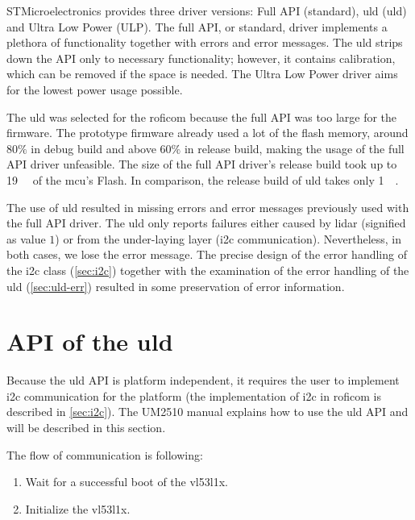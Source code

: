 \documentclass[
  digital,     %
  oneside,     %
  nosansbold,  %
  nocolorbold, %
  nolof,         %
  nolot,         %
]{fithesis4}
\begin{document}
{{{STMicroelectronics provides three driver versions: Full API (standard), \acrlong{uld} (\acrshort{uld}) and Ultra Low Power (ULP). The full API, or standard, driver implements a plethora of functionality together with errors and error messages. The \acrlong{uld} strips down the API only to necessary functionality; however, it contains calibration, which can be removed if the space is needed. The Ultra Low Power driver aims for the lowest power usage possible.

The \acrlong{uld} was selected for the \acrshort{roficom} because the full API was too large for the firmware. The prototype firmware already used a lot of the flash memory, around $80\%$ in debug build and above $60\%$ in release build, making the usage of the full API driver unfeasible. The size of the full API driver's release build took up to \qty{19}{\kilo\byte} of the \acrshort{mcu}'s Flash. In comparison, the release build of \acrlong{uld} takes only \qty{1}{\kilo\byte}. 

The use of \acrshort{uld} resulted in missing errors and error messages previously used with the full API driver. The \acrshort{uld} only reports failures either caused by lidar (signified as value $1$) or from the under-laying layer (\acrshort{i2c} communication). Nevertheless, in both cases, we lose the error message. The precise design of the error handling of the \acrshort{i2c} class (\autoref{sec:i2c}) together with the examination of the error handling of the \acrshort{uld} (\autoref{sec:uld-err}) resulted in some preservation of error information.

\section[ API of the Ultra Lite Driver ]{ API of the \acrlong{uld} } \label{sec:lidar-api}
Because the \acrshort{uld} API is platform independent, it requires the user to implement \acrshort{i2c} communication for the platform (the implementation of \acrshort{i2c} in \acrshort{roficom} is described in \autoref{sec:i2c}). The UM2510 \cite{um2510} manual explains how to use the \acrshort{uld} API and will be described in this section.

The flow of communication is following:
\begin{enumerate}
    \item Wait for a successful boot of the \gls{vl53l1x}.
    
    \item Initialize the \gls{vl53l1x}.
    

\end{enumerate}}}}
\end{document}
